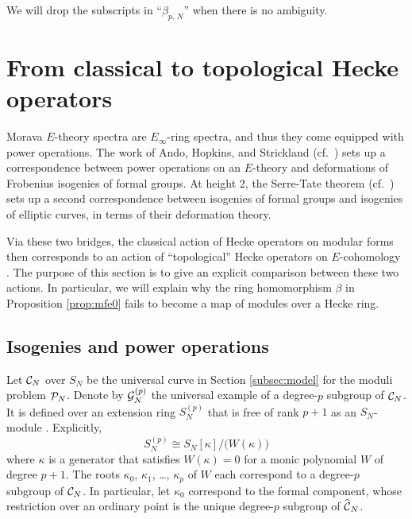 \documentclass{gtpart}
\theoremstyle{definition}
\theoremstyle{remark}
\newcommand{\CC}{{\cal C}}
\newcommand{\CG}{{\cal G}}
\newcommand{\CP}{{\cal P}}
\newcommand{\HCC}{\widehat{~\!\!\CC}}
\newcommand{\B}{\beta}
\newcommand{\K}{\kappa}
\renewcommand{\=}{\approx}
\renewcommand{\-}{\sim}
\numberwithin{equation}{section}
\numberwithin{thm}{section}
\begin{document}
We will drop the subscripts in ``$\B_{p,\,N}$'' when there is no ambiguity.  



\section{From classical to topological Hecke operators}
\label{sec:ct}

Morava $E$-theory spectra are $E_\infty$-ring spectra, and thus they come equipped with power operations.  
The work of Ando, Hopkins, and Strickland \cite{AHS04} (cf.~\cite[Theorem B]{cong}) sets up a correspondence 
between power operations on an $E$-theory and deformations of Frobenius isogenies of formal groups.  
At height 2, the Serre-Tate theorem \cite{LST} (cf.~\cite[Theorem 2.9.1]{KM}) sets up a second correspondence 
between isogenies of formal groups and isogenies of elliptic curves, in terms of their deformation theory.  

Via these two bridges, the classical action of Hecke operators on modular forms then corresponds to an action of ``topological'' Hecke operators on $E$-cohomology \cite[Section 14]{log}.  
The purpose of this section is to give an explicit comparison between these two actions.  
In particular, we will explain why the ring homomorphism $\B$ in Proposition \ref{prop:mfe0} fails to become a map of modules over a Hecke ring.  



\subsection{Isogenies and power operations}
\label{subsec:po}

Let $\CC_N$ over $S_N$ be the universal curve in Section \ref{subsec:model} for the moduli problem $\CP_N$.  
Denote by $\CG_N^{(p)}$ the universal example of a degree-$p$ subgroup of $\CC_N$.  
It is defined over an extension ring $S_N^{(p)}$ that is free of rank $p + 1$ as an $S_N$-module \cite[Theorem 6.6.1]{KM}.  
Explicitly, 
\[
 S_N^{(p)} \cong S_N[\K] / \big(W(\K)\big) 
\]
where $\K$ is a generator that satisfies $W(\K) = 0$ for a monic polynomial $W$ of degree $p + 1$.  
The roots $\K_0$, $\K_1$, \ldots, $\K_p$ of $W$ each correspond to a degree-$p$ subgroup of $\CC_N$.  
In particular, let $\K_0$ correspond to the formal component, 
whose restriction over an ordinary point is the unique degree-$p$ subgroup of $\HCC_N$.  
\end{document}
